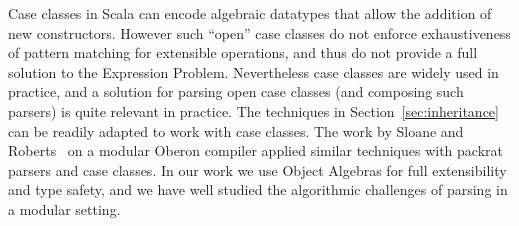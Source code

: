 Case classes in Scala can encode algebraic datatypes that allow the
addition of new constructors. However such ``open'' case classes 
do not enforce  exhaustiveness
of pattern matching for extensible operations, and thus do not provide 
a full solution to the Expression Problem. Nevertheless case classes 
are widely used in practice, and a solution for parsing open case
classes (and composing such parsers) is quite relevant in practice. 
The techniques in Section~\ref{sec:inheritance} can be readily adapted to work with case classes. 
The work by Sloane and Roberts~\cite{SLOANE201520} on a modular Oberon 
compiler applied similar techniques with packrat parsers and case classes.
In our work we use Object Algebras for full extensibility and type safety, and we have well
studied the algorithmic challenges of parsing in a modular setting.
\vspace{-7pt}

\begin{comment}
Moreover, in~\cite{Oliveira:2012} the authors have discussed the
composition of algebras. In our parsing approach, a parser consumes an
algebra, which is delegated to return the results, during its process
of parsing. Having a set of algebras, it requires multiple parsing
with several times of invocation, which leads to redundant work.
Instead, algebras are supposed to be composed into one before the
invocation of the parser. Bahr et al. lead a similar discussion
in~\cite{Bahr2011}, where queries (or \textit{catamorphisms}) and
transformations (or \textit{homomorphisms}) are composable. They have
also mentioned the dual process of folds, namely
\textit{anamorphisms}. It is potentially related to our work, as
parsing is a representative kind of unfolds, whereas they only
discussed the composition of a cv-coalgebra and a term homomorphism,
which differs from modular parsing.
\end{comment}

